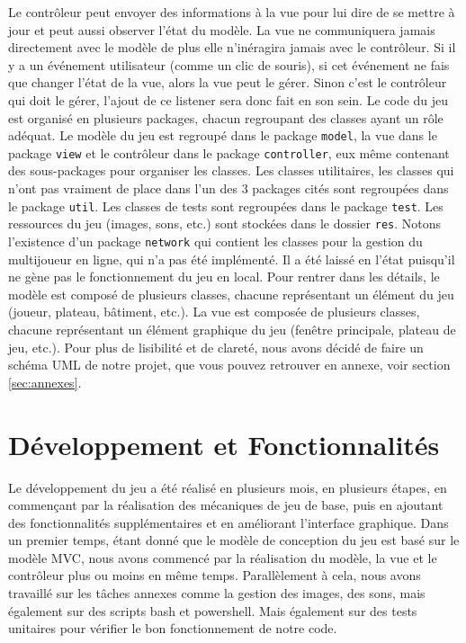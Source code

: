 \documentclass{article}
\begin{document}
    Le contrôleur peut envoyer des informations à la vue pour lui dire de se mettre à jour et peut aussi observer l'état du modèle.
    La vue ne communiquera jamais directement avec le modèle de plus elle n'inéragira jamais avec le contrôleur.
    Si il y a un événement utilisateur (comme un clic de souris), si cet événement ne fais que changer l'état de la vue, alors la vue peut le gérer.
    Sinon c'est le contrôleur qui doit le gérer, l'ajout de ce listener sera donc fait en son sein.
    \newline
    Le code du jeu est organisé en plusieurs packages, chacun regroupant des classes ayant un rôle adéquat.
    Le modèle du jeu est regroupé dans le package \texttt{model}, la vue dans le package \texttt{view} et le contrôleur dans le package \texttt{controller}, eux même contenant des sous-packages pour organiser les classes.
    Les classes utilitaires, les classes qui n'ont pas vraiment de place dans l'un des 3 packages cités sont regroupées dans le package \texttt{util}.
    Les classes de tests sont regroupées dans le package \texttt{test}.
    Les ressources du jeu (images, sons, etc.) sont stockées dans le dossier \texttt{res}.
    Notons l'existence d'un package \texttt{network} qui contient les classes pour la gestion du multijoueur en ligne, qui n'a pas été implémenté.
    Il a été laissé en l'état puisqu'il ne gène pas le fonctionnement du jeu en local.
    Pour rentrer dans les détails, le modèle est composé de plusieurs classes, chacune représentant un élément du jeu (joueur, plateau, bâtiment, etc.).
    La vue est composée de plusieurs classes, chacune représentant un élément graphique du jeu (fenêtre principale, plateau de jeu, etc.).
    Pour plus de lisibilité et de clareté, nous avons décidé de faire un schéma UML de notre projet, que vous pouvez retrouver en annexe, voir section \ref{sec:annexes}.

    \section{Développement et Fonctionnalités}\label{sec:developpement-et-fonctionnalites}

    Le développement du jeu a été réalisé en plusieurs mois, en plusieurs étapes, en commençant par la réalisation des mécaniques de jeu de base, puis en ajoutant des fonctionnalités supplémentaires et en améliorant l'interface graphique.
    Dans un premier temps, étant donné que le modèle de conception du jeu est basé sur le modèle MVC, nous avons commencé par la réalisation du modèle, la vue et le contrôleur plus ou moins en même temps.
    Parallèlement à cela, nous avons travaillé sur les tâches annexes comme la gestion des images, des sons, mais également sur des scripts bash et powershell.
    Mais également sur des tests unitaires pour vérifier le bon fonctionnement de notre code.
\end{document}
